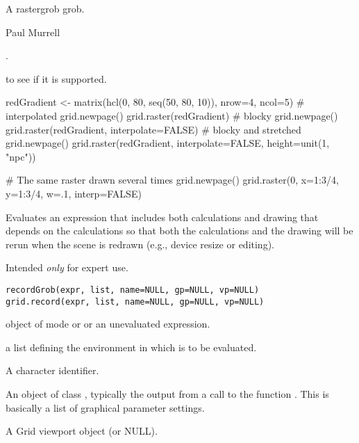 %
\begin{Value}
A rastergrob grob.
\end{Value}
%
\begin{Author}\relax
Paul Murrell
\end{Author}
%
\begin{SeeAlso}\relax
{}.

 to see if it is supported.
\end{SeeAlso}
%
\begin{Examples}
\begin{ExampleCode}
redGradient <- matrix(hcl(0, 80, seq(50, 80, 10)),
                      nrow=4, ncol=5)
# interpolated 
grid.newpage()
grid.raster(redGradient)
# blocky
grid.newpage()
grid.raster(redGradient, interpolate=FALSE)
# blocky and stretched
grid.newpage()
grid.raster(redGradient, interpolate=FALSE, height=unit(1, "npc"))

# The same raster drawn several times
grid.newpage()
grid.raster(0, x=1:3/4, y=1:3/4, w=.1, interp=FALSE)
\end{ExampleCode}
\end{Examples}
%
\begin{Description}\relax
Evaluates an expression that includes both calculations
and drawing that depends on the calculations so that
both the calculations and the drawing will be rerun when
the scene is redrawn (e.g., device resize or editing).

Intended \emph{only} for expert use.
\end{Description}
%
\begin{Usage}
\begin{verbatim}
recordGrob(expr, list, name=NULL, gp=NULL, vp=NULL)
grid.record(expr, list, name=NULL, gp=NULL, vp=NULL)
\end{verbatim}
\end{Usage}
%
\begin{Arguments}
\begin{ldescription}
\item[\code{expr}] object of mode  or  or
an unevaluated expression.
\item[\code{list}] a list defining the environment in which  is to
be evaluated.
\item[\code{name}]  A character identifier. 
\item[\code{gp}] An object of class , typically the output
from a call to the function .  This is basically
a list of graphical parameter settings.
\item[\code{vp}] A Grid viewport object (or NULL).
\end{ldescription}
\end{Arguments}
